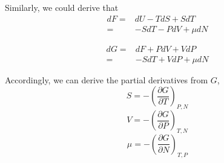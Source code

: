 Similarly, we could derive that 
\begin{equation} 
\begin{split}
dF  = &  dU - TdS + SdT   \\
    = & -SdT  - PdV + \mu dN 
\end{split}
\end{equation}

\begin{equation} 
\begin{split}
dG  = & dF + PdV + VdP   \\
    = & -SdT + VdP + \mu dN 
\end{split}
\end{equation}

Accordingly, we can derive the partial derivatives from $G$,
\begin{equation} S   = -(\frac{\partial {G}}{\partial {T}})_{P,N} \end{equation}
\begin{equation} V   = -(\frac{\partial {G}}{\partial {P}})_{T,N} \end{equation}
\begin{equation}\mu  = -(\frac{\partial {G}}{\partial {N}})_{T,P} \end{equation}



